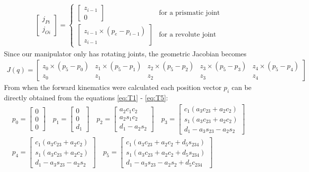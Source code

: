 \begin{align*}
    \begin{bmatrix}
        j_{Pi}\\j_{Oi}
    \end{bmatrix}
    =
    \begin{cases}
        \begin{bmatrix} z_{i-1}\\ 0 \end{bmatrix} & \text{for a prismatic joint}\\
        \begin{bmatrix} z_{i-1} \times (p_e-p_{i-1}) \\ z_{i-1} \end{bmatrix} & \text{for a revolute joint}
    \end{cases}
\end{align*}
Since our manipulator only has rotating joints, the geometric Jacobian becomes
\begin{align*}
    J(q) = 
    \begin{bmatrix}
        z_0 \times (p_5-p_0) & 
        z_1 \times (p_5-p_1) & 
        z_2 \times (p_5-p_2) & 
        z_3 \times (p_5-p_3) & 
        z_4 \times (p_5-p_4) \\
        z_0 &
        z_1 &
        z_2 &
        z_3 &
        z_4
    \end{bmatrix}
\end{align*}
From when the forward kinematics were calculated each position vector $p_i$ can be directly obtained from the equations \eqref{eq:T1} - \eqref{eq:T5}:
\begin{align*}
    p_0 = \begin{bmatrix} 0 \\ 0 \\ 0 \end{bmatrix}    \quad
    p_1 = \begin{bmatrix} 0 \\ 0 \\ d_1\end{bmatrix}    \quad
    p_2 = \begin{bmatrix} a_2c_1c_2\\ a_2s_1c_2\\ d_1 - a_2s_2\end{bmatrix}   \quad 
    p_3 = \begin{bmatrix} c_1(a_3c_{23} + a_2c_2) \\ s_1(a_3c_{23} + a_2c_2) \\ d_1 - a_3s_{23}-a_2s_2 \end{bmatrix}  \\  
    p_4 = \begin{bmatrix} c_1(a_3c_{23} + a_2c_2) \\ s_1(a_3c_{23} + a_2c_2) \\ d_1 - a_3s_{23}-a_2s_2\end{bmatrix}  \quad  
    p_5 = \begin{bmatrix} c_1(a_3c_{23} + a_2c_2 + d_5s_{234}) \\ s_1(a_3c_{23} + a_2c_2 + d_5s_{234}) \\ d_1 - a_3s_{23} - a_2s_2 + d_5c_{234} \end{bmatrix}    
\end{align*}
